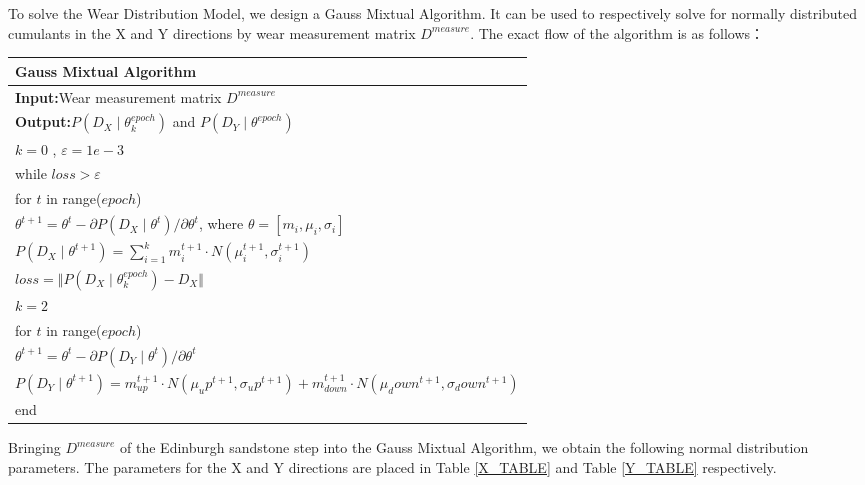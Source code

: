 \documentclass[12pt]{article}  %
\numberwithin{equation}{section} %
\begin{document}
To solve the Wear Distribution Model, we design a Gauss Mixtual Algorithm. It can be used to respectively solve for normally distributed cumulants in the X and Y directions by wear measurement matrix $D^{measure}$. The exact flow of the algorithm is as follows：

\begin{table}[H]
    \centering
    \renewcommand{\arraystretch}{1.5}
    \setlength{\tabcolsep}{16pt}
    \begin{tabular}{>{\raggedright\arraybackslash}p{15cm}} 
        \hline
        \textbf{Gauss Mixtual Algorithm}\\ 
        \hline
        \textbf{Input:}\quad Wear measurement matrix $D^{measure}$\\  %
        \textbf{Output:}\quad $P(D_X\mid\theta_k^{epoch})$ and $P(D_Y\mid\theta^{epoch})$ \\
        \(k = 0\) , \(\varepsilon = 1e-3\)\\
        while \(loss>\varepsilon\)\\ 
        \qquad for \(t\) in range($epoch$)\\ 
       \qquad\qquad \(\theta^{t+1}=\theta^{t}-
{\partial P(D_X\mid\theta^{t})}/{\partial \theta^t}
\), where $\theta=[ m_i,\mu_i,\sigma_i ]$\\
       \qquad\qquad $P(D_X\mid\theta^{t+1})=\sum_{i=1}^{k}m_i^{t+1}\cdot{N(\mu_i^{t+1},\sigma_i^{t+1})}$\\
      \qquad $loss = \Vert P(D_X\mid\theta_k^{epoch})-D_X \Vert$ \\

\(k = 2\)\\
for \(t\) in range($epoch$)\\ 
       \qquad \(\theta^{t+1}=\theta^{t}-
{\partial P(D_Y\mid\theta^{t})}/{\partial \theta^t}
\)\\
    \qquad $P(D_Y\mid\theta^{t+1})=m_{up}^{t+1}\cdot{N(\mu_up^{t+1},\sigma_up^{t+1})}+m_{down}^{t+1}\cdot{N(\mu_down^{t+1},\sigma_down^{t+1})}$\\
       end\\
        \hline
    \end{tabular}
    \vspace{-0.8em}
\end{table}
Bringing $D^{measure}$ of the  Edinburgh sandstone step into the Gauss Mixtual Algorithm, we obtain the following normal distribution parameters. The parameters for the X and Y directions are placed in Table \ref{X_TABLE} and Table \ref{Y_TABLE} respectively.
\end{document}
